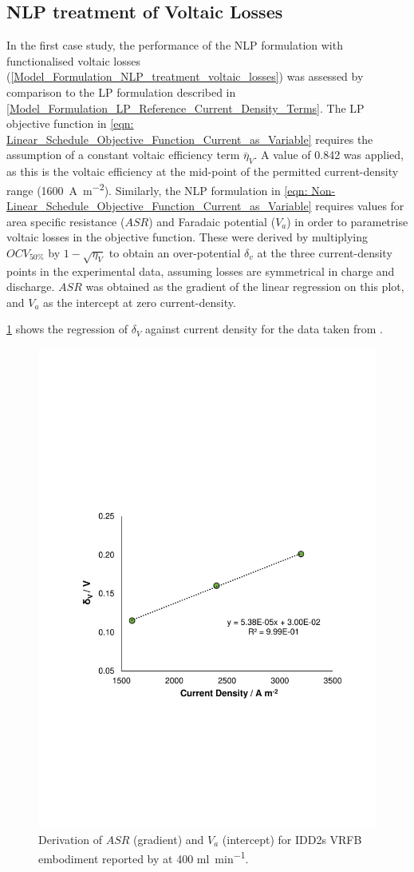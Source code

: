 \documentclass[preprint,3p,review,authoryear,10pt]{elsarticle}
\begin{document}
\subsection{NLP treatment of Voltaic Losses}
\label{Results_NLP_Treatment_Voltaic_losses}
In the first case study, the performance of the NLP formulation with functionalised voltaic losses (\cref{Model_Formulation_NLP_treatment_voltaic_losses}) was assessed by comparison to the LP formulation described in \cref{Model_Formulation_LP_Reference_Current_Density_Terms}. The LP objective function in \cref{eqn: Linear_Schedule_Objective_Function_Current_as_Variable} requires the assumption of a constant voltaic efficiency term $\bar\eta_{V}$. A value of 0.842 was applied, as this is the voltaic efficiency at the mid-point of the permitted current-density range (\SI{1600}{\ampere\per\square\meter}). Similarly, the NLP formulation in \cref{eqn: Non-Linear_Schedule_Objective_Function_Current_as_Variable} requires values for area specific resistance ($ASR$) and Faradaic potential ($V_a$) in order to parametrise voltaic losses in the objective function. These were derived by multiplying $OCV_{50\%}$ by $1-\sqrt{\eta_V}$ to obtain an over-potential $\delta_v$ at the three current-density points in the experimental data, assuming losses are symmetrical in charge and discharge. $ASR$ was obtained as the gradient of the linear regression on this plot, and $V_a$ as the intercept at zero current-density.

\cref{fig:Va_ASR_Derivation} shows the regression of $\delta_V$ against current density for the data taken from \cite{Reed2016}.

\begin{figure}[!ht]
\centering
\includegraphics[trim = 2cm 8cm 2cm 9cm, clip, width = .5\textwidth]{./ASR_deriv.pdf}
\caption{Derivation of $ASR$ (gradient) and $V_a$ (intercept) for IDD2s VRFB embodiment reported by \cite{Reed2016} at 400 \si{\ml\per\minute}.}
\label{fig:Va_ASR_Derivation}
\end{figure}
\end{document}
